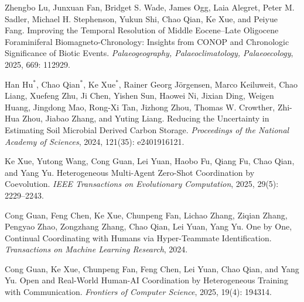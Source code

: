 \documentclass[10pt,a4paper]{article}
\begin{document}
\begin{cvbullet}
  \item Zhengbo Lu, Junxuan Fan, Bridget S. Wade, James Ogg, Laia Alegret, Peter M. Sadler, Michael H. Stephenson, Yukun Shi, Chao Qian, Ke Xue, and Peiyue Fang. Improving the Temporal Resolution of Middle Eocene--Late Oligocene Foraminiferal Biomagneto-Chronology: Insights from CONOP and Chronologic Significance of Biotic Events. \textit{Palaeogeography, Palaeoclimatology, Palaeoecology}, 2025, 669: 112929.
  \item Han Hu$^*$, Chao Qian$^*$, Ke Xue$^*$, Rainer Georg Jörgensen, Marco Keiluweit, Chao Liang, Xuefeng Zhu, Ji Chen, Yishen Sun, Haowei Ni, Jixian Ding, Weigen Huang, Jingdong Mao, Rong-Xi Tan, Jizhong Zhou, Thomas W. Crowther, Zhi-Hua Zhou, Jiabao Zhang, and Yuting Liang. Reducing the Uncertainty in Estimating Soil Microbial Derived Carbon Storage. \textit{Proceedings of the National Academy of Sciences}, 2024, 121(35): e2401916121.
  \item Ke Xue, Yutong Wang, Cong Guan, Lei Yuan, Haobo Fu, Qiang Fu, Chao Qian, and Yang Yu. Heterogeneous Multi-Agent Zero-Shot Coordination by Coevolution. \textit{IEEE Transactions on Evolutionary Computation}, 2025, 29(5): 2229--2243.
  \item Cong Guan, Feng Chen, Ke Xue, Chunpeng Fan, Lichao Zhang, Ziqian Zhang, Pengyao Zhao, Zongzhang Zhang, Chao Qian, Lei Yuan, Yang Yu. One by One, Continual Coordinating with Humans via Hyper-Teammate Identification. \textit{Transactions on Machine Learning Research}, 2024.
  \item Cong Guan, Ke Xue, Chunpeng Fan, Feng Chen, Lei Yuan, Chao Qian, and Yang Yu. Open and Real-World Human-AI Coordination by Heterogeneous Training with Communication. \textit{Frontiers of Computer Science}, 2025, 19(4): 194314.
\end{cvbullet}
\end{document}
